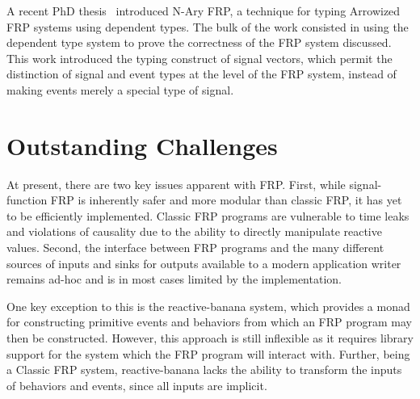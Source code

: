 A recent PhD thesis~\cite{Sculthorpe2011} introduced N-Ary FRP, a technique for
typing Arrowized FRP systems using dependent types. The bulk of the work
consisted in using the dependent type system to prove the correctness of the FRP
system discussed. This work introduced the typing construct of signal vectors,
which permit the distinction of signal and event types at the level of the FRP
system, instead of making events merely a special type of signal.

\section{Outstanding Challenges}
\label{section:Background-outstanding_challenges}

At present, there are two key issues apparent with FRP. First, while
signal-function FRP is inherently safer and more modular than classic FRP, it
has yet to be efficiently implemented. Classic FRP programs are vulnerable to
time leaks and violations of causality due to the ability to directly manipulate
reactive values. Second, the interface between FRP programs and the many
different sources of inputs and sinks for outputs available to a modern
application writer remains ad-hoc and is in most cases limited by the
implementation.

One key exception to this is the reactive-banana system, which provides a monad
for constructing primitive events and behaviors from which an FRP program may
then be constructed. However, this approach is still inflexible as it requires
library support for the system which the FRP program will interact with.
Further, being a Classic FRP system, reactive-banana lacks the ability to
transform the inputs of behaviors and events, since all inputs are implicit.